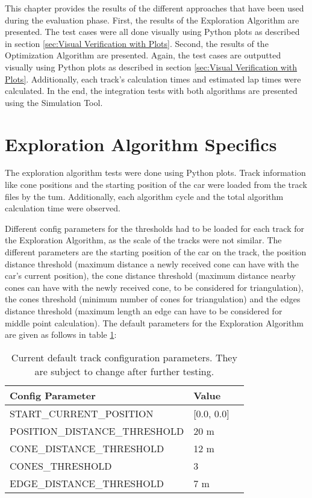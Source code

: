 This chapter provides the results of the different approaches that have been used during the evaluation phase. First, the results of the Exploration Algorithm are presented. The test cases were all done visually using Python plots as described in section \ref{sec:Visual Verification with Plots}. Second, the results of the Optimization Algorithm are presented. Again, the test cases are outputted visually using Python plots as described in section \ref{sec:Visual Verification with Plots}. Additionally, each track's calculation times and estimated lap times were calculated. In the end, the integration tests with both algorithms are presented using the Simulation Tool.

\section{Exploration Algorithm Specifics} \label{sec:Exploration Algorithm Specifics}
The exploration algorithm tests were done using Python plots. Track information like cone positions and the starting position of the car were loaded from the track files by the \acrlong{tum}. \cite{tumftm_optimization_algoritm} Additionally, each algorithm cycle and the total algorithm calculation time were observed.

Different config parameters for the thresholds had to be loaded for each track for the Exploration Algorithm, as the scale of the tracks were not similar. The different parameters are the starting position of the car on the track, the position distance threshold (maximum distance a newly received cone can have with the car's current position), the cone distance threshold (maximum distance nearby cones can have with the newly received cone, to be considered for triangulation), the cones threshold (minimum number of cones for triangulation) and the edges distance threshold (maximum length an edge can have to be considered for middle point calculation). The default parameters for the Exploration Algorithm are given as follows in table \ref{tab:Default Track Config for Exploration Algorithm}:
\begin{table}[H]
    \centering
    \begin{tabular}{|l|l|l|}
        \hline
        \textbf{Config Parameter}     & \textbf{Value} \\ \hline
        START\_CURRENT\_POSITION      & [0.0, 0.0]     \\ \hline
        POSITION\_DISTANCE\_THRESHOLD & 20 m           \\ \hline
        CONE\_DISTANCE\_THRESHOLD     & 12 m           \\ \hline
        CONES\_THRESHOLD              & 3              \\ \hline
        EDGE\_DISTANCE\_THRESHOLD     & 7 m            \\ \hline
    \end{tabular}
    \caption{Current default track configuration parameters. They are subject to change after further testing.}
    \label{tab:Default Track Config for Exploration Algorithm}
\end{table}

